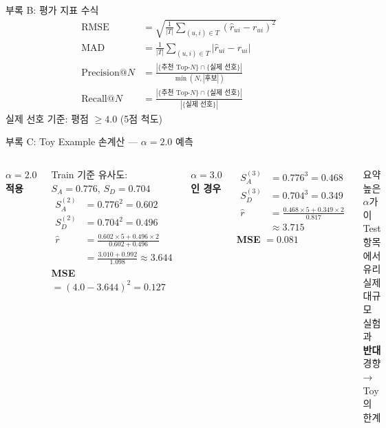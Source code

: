 \documentclass[aspectratio=169, 10pt]{beamer}
\begin{document}
\begin{frame}{부록 B: 평가 지표 수식}
  \begin{align*}
    \text{RMSE} &= \sqrt{\frac{1}{|T|}\sum_{(u,i)\in T}(\hat{r}_{ui} - r_{ui})^2} \\[6pt]
    \text{MAD}  &= \frac{1}{|T|}\sum_{(u,i)\in T}|\hat{r}_{ui} - r_{ui}| \\[6pt]
    \text{Precision}@N &= \frac{|\{\text{추천 Top-}N\} \cap \{\text{실제 선호}\}|}
                               {\min(N,|\text{후보}|)} \\[6pt]
    \text{Recall}@N    &= \frac{|\{\text{추천 Top-}N\} \cap \{\text{실제 선호}\}|}
                               {|\{\text{실제 선호}\}|}
  \end{align*}
  {\small 실제 선호 기준: 평점 $\geq 4.0$ (5점 척도)}
\end{frame}

\begin{frame}[shrink=5]{부록 C: Toy Example 손계산 — $\alpha=2.0$ 예측}
  \begin{columns}[T]
      \textbf{$\alpha = 2.0$ 적용}
      \vspace{0.4em}

      Train 기준 유사도: $S_A = 0.776$, $S_D = 0.704$
      \begin{align*}
        S_A^{(2)} &= 0.776^2 = 0.602\\
        S_D^{(2)} &= 0.704^2 = 0.496\\[6pt]
        \hat{r}   &= \frac{0{.}602 \times 5 + 0{.}496 \times 2}
                          {0{.}602 + 0{.}496}\\
                  &= \frac{3{.}010 + 0{.}992}{1{.}098}
                   \approx 3{.}644
      \end{align*}
      \textbf{MSE} $= (4.0 - 3.644)^2 = 0.127$

      \textbf{$\alpha = 3.0$인 경우}
      \vspace{0.4em}

      \begin{align*}
        S_A^{(3)} &= 0.776^3 = 0.468\\
        S_D^{(3)} &= 0.704^3 = 0.349\\[6pt]
        \hat{r}   &= \frac{0{.}468\times5 + 0{.}349\times2}{0{.}817}\\
                  &\approx 3{.}715
      \end{align*}
      \textbf{MSE} $= 0.081$

      \begin{block}{요약}
        높은 $\alpha$가 이 Test 항목에서 유리\\
        실제 대규모 실험과 \textbf{반대} 경향\\
        → Toy의 한계
      \end{block}
  \end{columns}
\end{frame}
\end{document}
